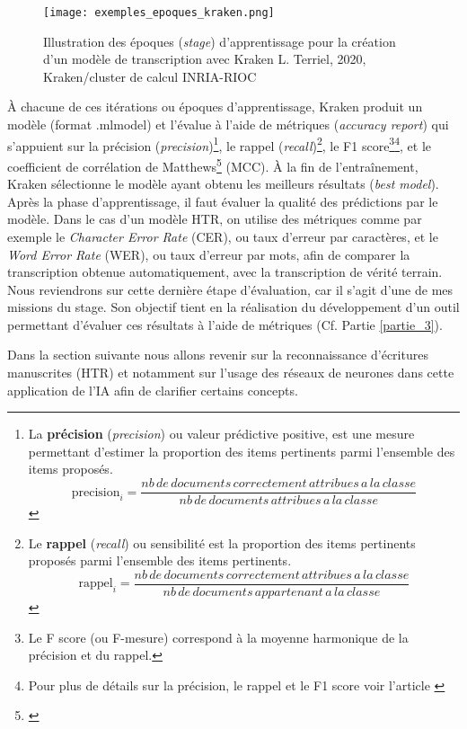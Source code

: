\begin{figure}[h]
    \centering
    \centerline{\texttt{[image: exemples\_epoques\_kraken.png]}}
    \caption{Illustration des époques (\textit{stage}) d'apprentissage pour la création d'un modèle de transcription avec Kraken \textcopyright L. Terriel, 2020, Kraken/cluster de calcul INRIA-RIOC}
    \label{fig:epoque_kraken_prompt}
\end{figure}
\newpage
À chacune de ces itérations ou époques d'apprentissage, Kraken produit un modèle (format .mlmodel) et l'évalue à l'aide de métriques (\textit{accuracy report}) qui s'appuient sur la précision (\textit{precision})\footnote{La \textbf{précision} (\textit{precision}) ou valeur prédictive positive, est une mesure permettant d'estimer la proportion des items pertinents parmi l'ensemble des items proposés. 
$$\text{precision}_i = \frac{nb\,de\,documents\,correctement\,attribues\,a\,la\,classe}{nb\,de\,documents\,attribues\,a\,la\,classe}$$}, le rappel (\textit{recall})\footnote{Le \textbf{rappel} (\textit{recall}) ou sensibilité est la proportion des items pertinents proposés parmi l'ensemble des items pertinents.
$$ \text{rappel}_i = \frac{nb\,de\,documents\,correctement\,attribues\,a\,la\,classe}{nb\,de\,documents\,appartenant\,a\,la\,classe} $$}, le F1 score\footnote{Le F score (ou F-mesure) correspond à la moyenne harmonique de la précision et du rappel.}\footnote{Pour plus de détails sur la précision, le rappel et le F1 score voir l'article \cite{wikipedia_precision_nodate}}, et le coefficient de corrélation de Matthews\footnote{\cite{wikipedia_matthews_nodate}} (MCC). À la fin de l'entraînement, Kraken sélectionne le modèle ayant obtenu les meilleurs résultats (\textit{best model}).\\

Après la phase d'apprentissage, il faut évaluer la qualité des prédictions par le modèle. Dans le cas d'un modèle HTR, on utilise des métriques comme par exemple le \textit{Character Error Rate} (CER), ou taux d'erreur par caractères, et le \textit{Word Error Rate} (WER), ou taux d'erreur par mots, afin de comparer la transcription obtenue automatiquement, avec la transcription de vérité terrain. 
\newpage
Nous reviendrons sur cette dernière étape d'évaluation, car il s'agit d'une de mes missions du stage. Son objectif tient en la réalisation du développement d'un outil permettant d'évaluer ces résultats à l'aide de métriques (Cf. Partie \ref{partie_3}).

Dans la section suivante nous allons revenir sur la reconnaissance d'écritures manuscrites (HTR) et notamment sur l'usage des réseaux de neurones dans cette application de l'IA afin de clarifier certains concepts.
\newpage
